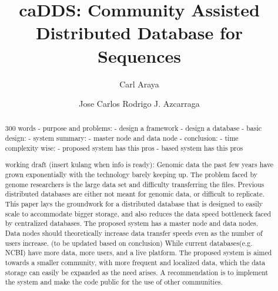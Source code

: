 \documentclass[acmsmall]{acmart}
\begin{document}
\title{caDDS: Community Assisted Distributed Database for Sequences}

\author{Carl Araya}

\author{Jose Carlos Rodrigo J. Azcarraga}
\authornotemark[1]


\renewcommand{\shortauthors}{Araya and Azcarraga}

\begin{abstract}
300 words
- purpose and problems:
    - design a framework
    - design a database
- basic design:
- system summary:
    - master node and data node
- conclusion:
    - time complexity wise: 
    - proposed system has this pros
    - based system has this pros

working draft (insert kulang when info is ready):
 Genomic data the past few years have grown exponentially with the technology barely keeping up. The problem faced by genome researchers is the large data set and difficulty transferring the files. Previous distributed databases are either not meant for genomic data, or difficult to replicate. This paper lays the groundwork for a distributed database that is designed to easily scale to accommodate bigger storage, and also reduces the data speed bottleneck faced by centralized databases. The proposed system has a master node and data nodes. Data nodes should theoretically increase data transfer speeds even as the number of users increase. (to be updated based on conclusion) While current databases(e.g. NCBI) have more data, more users, and a live platform. The proposed system is aimed towards a smaller community, with more frequent and localized data, which the data storage can easily be expanded as the need arises. A recommendation is to implement the system and make the code public for the use of other communities.
\end{abstract}
\end{document}

